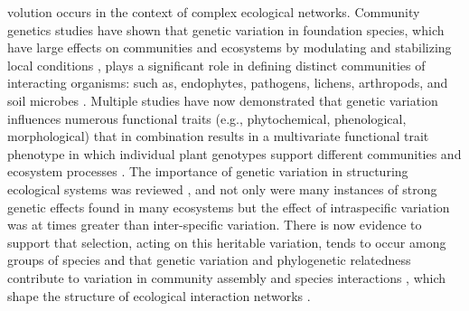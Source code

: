 \documentclass[11pt,twocolumn,twoside,lineno]{pnas-new}
\begin{document}


\maketitle \thispagestyle{firststyle}





volution occurs in the context of complex ecological
networks. Community genetics studies have shown that genetic variation
in foundation species, which have large effects on communities and
ecosystems by modulating and stabilizing local conditions
\cite{Ellison2005}, plays a significant role in defining distinct
communities of interacting organisms: such as, endophytes, pathogens,
lichens, arthropods, and soil microbes \cite{Busby2015, Barbour2009c,
  Lamit2015c}. Multiple studies have now demonstrated that genetic
variation influences numerous functional traits (e.g., phytochemical,
phenological, morphological) that in combination results in a
multivariate functional trait phenotype \cite{holeski2012} in which
individual plant genotypes support different communities and ecosystem
processes \cite{Bailey2009a, Whitham2012}. The importance of genetic
variation in structuring ecological systems was reviewed
\cite{DesRoches2018TheVariation}, and not only were many instances of
strong genetic effects found in many ecosystems but the effect of
intraspecific variation was at times greater than inter-specific
variation. There is now evidence to support that selection, acting on
this heritable variation, tends to occur among groups of species
\cite{Wade2007TheCommunities} and that genetic variation and
phylogenetic relatedness contribute to variation in community assembly
\cite{Crutsinger2016} and species interactions \cite{Whitham2006a,
  Bailey2009a, Moya-Larano2011}, which shape the structure of
ecological interaction networks \cite{Rezende2007,
  Guimaraes2007InteractionNetworks, Gomez2009LocalMosaic}.
\end{document}
